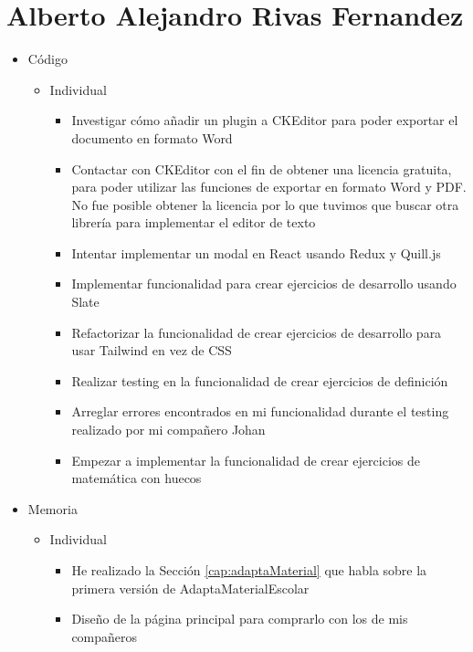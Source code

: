 \section{Alberto Alejandro Rivas Fernandez}
\begin{itemize}
    \item Código
          \begin{itemize}
              \item Individual
                    \begin{itemize}
                        \item Investigar cómo añadir un plugin a CKEditor para poder exportar el documento en formato Word
                        \item Contactar con CKEditor con el fin de obtener una licencia gratuita, para poder utilizar las funciones de exportar en formato Word y PDF. No fue posible obtener la licencia por lo que tuvimos que buscar otra librería para implementar el editor de texto
                        \item Intentar implementar un modal en React usando Redux y Quill.js
                        \item Implementar funcionalidad para crear ejercicios de desarrollo usando Slate
                        \item Refactorizar la funcionalidad de crear ejercicios de desarrollo para usar Tailwind en vez de CSS
                        \item Realizar testing en la funcionalidad de crear ejercicios de definición
                        \item Arreglar errores encontrados en mi funcionalidad durante el testing realizado por mi compañero Johan
                        \item Empezar a implementar la funcionalidad de crear ejercicios de matemática con huecos
                    \end{itemize}
          \end{itemize}
    \item Memoria
          \begin{itemize}
              \item Individual
                    \begin{itemize}
                        \item He realizado la Sección \ref{cap:adaptaMaterial} que habla sobre la primera versión de AdaptaMaterialEscolar
                        \item Diseño de la página principal para comprarlo con los de mis compañeros

\end{itemize}
\end{itemize}
\end{itemize}
